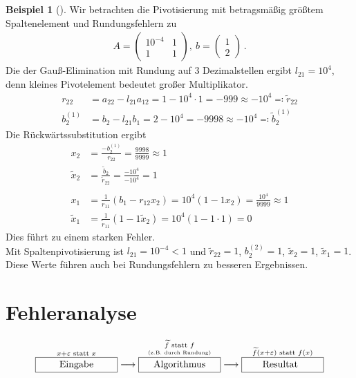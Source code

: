\documentclass[ngerman,fontsize=11pt, paper=a4, parskip=half, titlepage=true, toc=bib]{scrbook}
\theoremstyle{definition}
\newtheorem{Bsp}[Def]{Beispiel}
\theoremstyle{plain}
\newcommand{\subsectione}[1]{\addtocounter{Def}{1}\subsection{#1}}
\newenvironment{Bspe}[1][]{ %
  \begin{Bsp}[#1]
  }
  {
  \end{Bsp}
  \addtocounter{subsection}{1}
}
\begin{document}
\begin{Bspe}
  Wir betrachten die Pivotisierung mit betragsmäßig größtem Spaltenelement
  und Rundungsfehlern zu
  \begin{gather*}
    A=\begin{pmatrix}
      10^{-4} & 1 \\ 1 & 1
    \end{pmatrix}, ~
    b= \begin{pmatrix*}
      1 \\ 2
    \end{pmatrix*}\, .
  \end{gather*}
  Die der Gauß-Elimination mit Rundung auf 3 Dezimalstellen ergibt
  $l_{21}=10^4$, denn kleines Pivotelement bedeutet großer Multiplikator. \\
  \begin{align*}
    r_{22}&=a_{22}-l_{21}a_{12} = 1-10^4\cdot 1 = -999 \approx -10^4 \eqqcolon \widetilde{r}_{22}\\
    b_2^{(1)} & = b_2-l_{21}b_1 = 2-10^4 = -9998 \approx -10^4 \eqqcolon \widetilde{b}_2^{(1)} 
  \end{align*}
  Die Rückwärtssubstitution ergibt
  \begin{align*}
    x_2 &= \frac{-b_2^{(1)}}{r_{22}} = \frac{9998}{9999} \approx 1\\
    \widetilde{x}_	2 &= \frac{\widetilde{b}_2}{\widetilde{r}_{22}} = \frac{-10^4}{-10^4} = 1 \\\\
    x_1 &= \frac{1}{r_{11}}(b_1-r_{12}x_2)= 10^4 (1-1x_2) = \frac{10^4}{9999}\approx 1\\
    \widetilde{	x}_1 &= \frac{1}{\widetilde{r}_{11}}(1-1\widetilde{x}_2)= 10^4 (1-1\cdot 1) = 0 
  \end{align*}
  Dies führt zu einem starken Fehler.\\
  
  Mit Spaltenpivotisierung ist $l_{21}=10^{-4}<1$ und 
  $\widetilde{r}_{22}=1$, $b_2^{(2)} = 1$, $\widetilde{x}_2=1$, $\widetilde{x}_1=1$.\\
  Diese Werte führen auch bei Rundungsfehlern zu besseren Ergebnissen.
\end{Bspe}


\chapter{Fehleranalyse} \label{3}
% 
\begin{align*}
  \overset{x+\varepsilon \text{ statt } x}{\framebox[3cm]{Eingabe}} \longrightarrow 
  \overset{\underset{\text{\tiny (z.B. durch Rundung)}}{\widetilde{f} \text{ statt } f}}{\framebox[3cm]{Algorithmus}} \longrightarrow
  \overset{\widetilde{f}(x+\varepsilon) \text{ statt } f(x)}{\framebox[3cm]{Resultat\phantom{g}}}
\end{align*}\\
\end{document}
